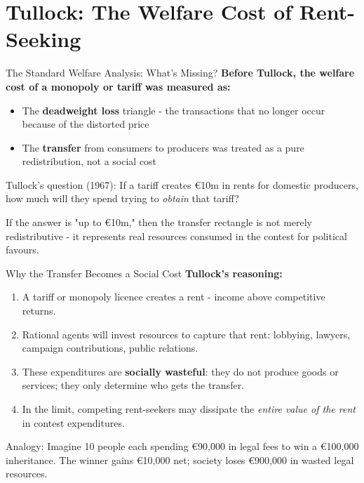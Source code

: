 \documentclass[10pt]{beamer}
\begin{document}
\section{Tullock: The Welfare Cost of Rent-Seeking}

\begin{frame}{The Standard Welfare Analysis: What's Missing?}
\textbf{Before Tullock, the welfare cost of a monopoly or tariff was measured as:}

\vspace{0.1cm}
\begin{itemize}
\item The \textbf{deadweight loss} triangle - the transactions that no longer occur because of the distorted price
\item The \textbf{transfer} from consumers to producers was treated as a pure redistribution, not a social cost
\end{itemize}

\vspace{0.2cm}
\alert{Tullock's question (1967):}
If a tariff creates \euro 10m in rents for domestic producers, how much will they spend trying to \emph{obtain} that tariff?

\vspace{0.1cm}
If the answer is "up to \euro 10m," then the transfer rectangle is not merely redistributive - it represents real resources consumed in the contest for political favours.
\end{frame}



\begin{frame}{Why the Transfer Becomes a Social Cost}
\textbf{Tullock's reasoning:}

\begin{enumerate}
\item A tariff or monopoly licence creates a \alert{rent} - income above competitive returns.
\item Rational agents will invest resources to capture that rent: lobbying, lawyers, campaign contributions, public relations.
\item These expenditures are \textbf{socially wasteful}: they do not produce goods or services; they only determine who gets the transfer.
\item In the limit, competing rent-seekers may dissipate the \emph{entire value of the rent} in contest expenditures.
\end{enumerate}

\vspace{0.1cm}
\alert{Analogy:} 
Imagine 10 people each spending \euro 90,000 in legal fees to win a \euro 100,000 inheritance.
The winner gains \euro 10,000 net; society loses \euro 900,000 in wasted legal resources.
\end{frame}
\end{document}
